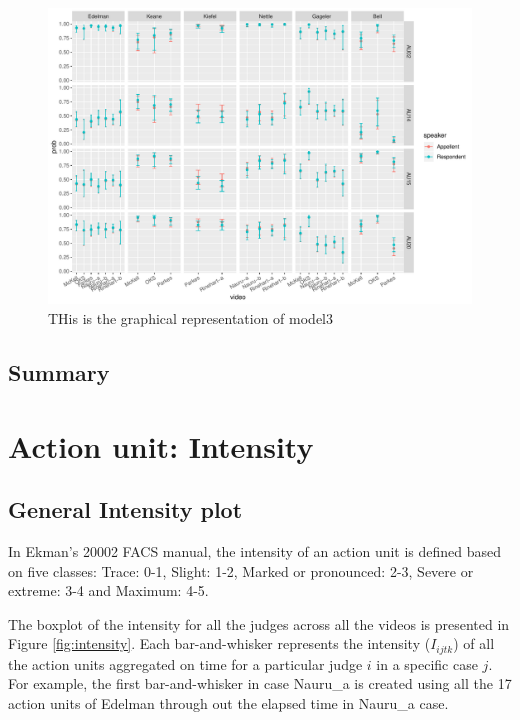 \documentclass{monashthesis}
\begin{document}
\begin{figure}

{\centering \includegraphics[width=1\linewidth]{figures/unnamed-chunk-13-1} 

}

\caption{THis is the graphical representation of model3\label{fig:model_3_plot}}\label{fig:unnamed-chunk-13}
\end{figure}

\hypertarget{summary}{%
\subsection{Summary}\label{summary}}

\hypertarget{action-unit-intensity}{%
\section{Action unit: Intensity}\label{action-unit-intensity}}

\hypertarget{general-intensity-plot}{%
\subsection{General Intensity plot}\label{general-intensity-plot}}

In Ekman's 20002 FACS manual, the intensity of an action unit is defined based on five classes: Trace: 0-1, Slight: 1-2, Marked or pronounced: 2-3, Severe or extreme: 3-4 and Maximum: 4-5.

The boxplot of the intensity for all the judges across all the videos is presented in Figure \ref{fig:intensity}. Each bar-and-whisker represents the intensity (\(I_{ijtk}\)) of all the action units aggregated on time for a particular judge \(i\) in a specific case \(j\). For example, the first bar-and-whisker in case Nauru\_a is created using all the 17 action units of Edelman through out the elapsed time in Nauru\_a case.
\end{document}
